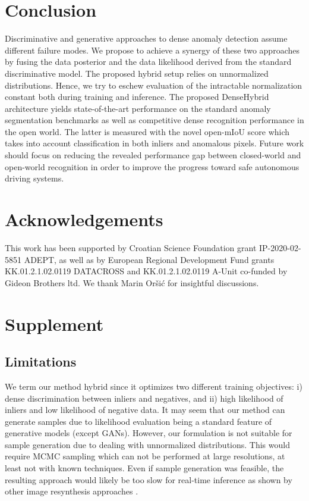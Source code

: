 \documentclass[runningheads]{llncs}
\begin{document}
\section{Conclusion}

Discriminative and generative approaches to dense anomaly detection assume different failure modes.
We propose to achieve a synergy of these two approaches by fusing the data posterior and the data likelihood derived from the standard discriminative model.
The proposed hybrid setup relies on unnormalized distributions.
Hence, we try to eschew evaluation of the intractable normalization constant both during  training and inference.
The proposed DenseHybrid architecture yields state-of-the-art performance on the standard anomaly segmentation benchmarks as well as competitive dense recognition performance in the open world.
The latter is measured with the novel open-mIoU score which takes into account classification in both inliers and anomalous pixels.
Future work should focus on reducing the revealed performance gap between closed-world and open-world recognition in order to improve the progress toward safe autonomous driving systems.

\section*{Acknowledgements}
This work has been supported by Croatian Science Foundation grant IP-2020-02-5851 ADEPT, as well as by European Regional Development Fund grants KK.01.2.1.02.0119 DATACROSS and KK.01.2.1.02.0119 A-Unit co-funded by Gideon Brothers ltd. We thank Marin Oršić for insightful discussions.




\newpage
\section{Supplement}

\subsection{Limitations}
We term our method hybrid since it optimizes two different training objectives:
i) dense discrimination between inliers and negatives, and
ii) high likelihood of inliers and low likelihood of negative data.
 It may seem that our method can generate samples
due to likelihood evaluation being
a standard feature of generative models (except GANs).
However, our formulation is not suitable for sample generation due to dealing with unnormalized distributions.
This would require MCMC sampling which can not be performed at large resolutions, at least not with known techniques.
Even if sample generation was feasible, the resulting approach would likely be too slow for real-time inference as shown by other image resynthesis approaches \cite{lis19iccv,biase21cvpr}.
\end{document}
